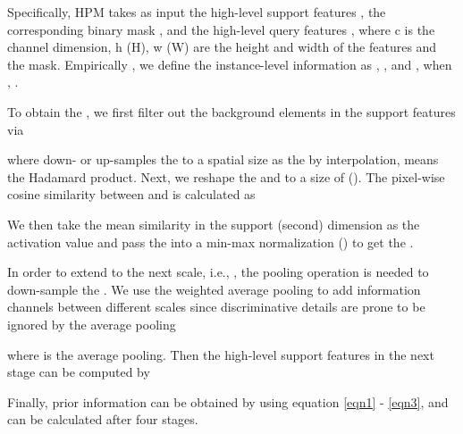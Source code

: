 \documentclass[10pt,twocolumn,letterpaper]{article}
\begin{document}
Specifically, HPM takes as input the high-level support features , the corresponding binary mask , and the high-level query features , where c is the channel dimension, h (H), w (W) are the height and width of the features and the mask. Empirically \cite{pfenet}, we define the instance-level information as , , and , when , . \par
To obtain the , we first filter out the background elements in the support features via

where  down- or up-samples the  to a spatial size as the  by interpolation,  means the Hadamard product. Next, we reshape the  and  to a size of (). The pixel-wise cosine similarity  between  and  is calculated as 

We then take the mean similarity in the support (second) dimension as the activation value and pass the  into a min-max normalization () to get the .



In order to extend to the next scale, i.e., , the pooling operation is needed to down-sample the . We use the weighted average pooling to add information channels between different scales since discriminative details are prone to be ignored by the average pooling

where  is the average pooling. Then the high-level support features in the next stage can be computed by

\par
Finally, prior information  can be obtained by using equation \ref{eqn1} - \ref{eqn3}, and  can be calculated after four stages.
\end{document}
